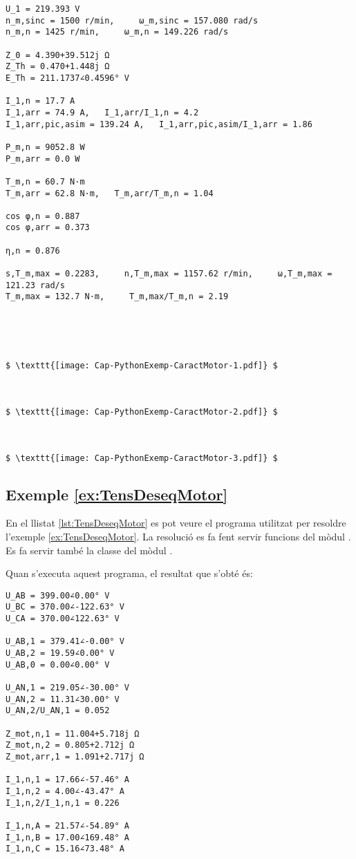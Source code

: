\begin{lstlisting}[mathescape=true]
U_1 = 219.393 V
n_m,sinc = 1500 r/min,     ω_m,sinc = 157.080 rad/s
n_m,n = 1425 r/min,     ω_m,n = 149.226 rad/s

Z_0 = 4.390+39.512j Ω
Z_Th = 0.470+1.448j Ω
E_Th = 211.1737∠0.4596° V

I_1,n = 17.7 A
I_1,arr = 74.9 A,   I_1,arr/I_1,n = 4.2
I_1,arr,pic,asim = 139.24 A,   I_1,arr,pic,asim/I_1,arr = 1.86

P_m,n = 9052.8 W
P_m,arr = 0.0 W

T_m,n = 60.7 N·m
T_m,arr = 62.8 N·m,   T_m,arr/T_m,n = 1.04

cos φ,n = 0.887
cos φ,arr = 0.373

η,n = 0.876

s,T_m,max = 0.2283,     n,T_m,max = 1157.62 r/min,     ω,T_m,max = 121.23 rad/s
T_m,max = 132.7 N·m,     T_m,max/T_m,n = 2.19





$ \texttt{[image: Cap-PythonExemp-CaractMotor-1.pdf]} $



$ \texttt{[image: Cap-PythonExemp-CaractMotor-2.pdf]} $



$ \texttt{[image: Cap-PythonExemp-CaractMotor-3.pdf]} $
\end{lstlisting} 




\hypertarget{exemple:TensDeseqMotor}{\subsection{Exemple \ref*{ex:TensDeseqMotor} \TensDeseqMotor}}
En el llistat \vref{lst:TensDeseqMotor} es pot veure el programa utilitzat per resoldre l'exemple \vref{ex:TensDeseqMotor}. La resolució es fa fent servir funcions del mòdul . Es fa servir també la classe  del mòdul .


Quan s'executa aquest programa, el resultat que s'obté és:
\lstset{
	language=,
	numbers=none,
	frame=none
}
\begin{lstlisting}
U_AB = 399.00∠0.00° V
U_BC = 370.00∠-122.63° V
U_CA = 370.00∠122.63° V

U_AB,1 = 379.41∠-0.00° V
U_AB,2 = 19.59∠0.00° V
U_AB,0 = 0.00∠0.00° V

U_AN,1 = 219.05∠-30.00° V
U_AN,2 = 11.31∠30.00° V
U_AN,2/U_AN,1 = 0.052

Z_mot,n,1 = 11.004+5.718j Ω
Z_mot,n,2 = 0.805+2.712j Ω
Z_mot,arr,1 = 1.091+2.717j Ω

I_1,n,1 = 17.66∠-57.46° A
I_1,n,2 = 4.00∠-43.47° A
I_1,n,2/I_1,n,1 = 0.226

I_1,n,A = 21.57∠-54.89° A
I_1,n,B = 17.00∠169.48° A
I_1,n,C = 15.16∠73.48° A
\end{lstlisting} 


